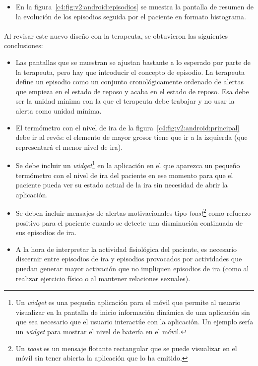 \begin{itemize}
    \item En la figura~\ref{c4:fig:v2:android:episodios} se muestra la pantalla de resumen de la evolución de los episodios seguida por el paciente en formato histograma.
\end{itemize}

\paragraph{}
Al revisar este nuevo diseño con la terapeuta, se obtuvieron las siguientes conclusiones:

\begin{itemize}
    \item Las pantallas que se muestran se ajustan bastante a lo esperado por parte de la terapeuta, pero hay que introducir el concepto de episodio. La terapeuta define un episodio como un conjunto cronológicamente ordenado de alertas que empieza en el estado de reposo y acaba en el estado de reposo. Esa debe ser la unidad mínima con la que el terapeuta debe trabajar y no usar la alerta como unidad mínima.
    \item El termómetro con el nivel de ira de la figura~\ref{c4:fig:v2:android:principal} debe ir al revés: el elemento de mayor grosor tiene que ir a la izquierda (que representará el menor nivel de ira).
    \item Se debe incluir un \textit{widget}\footnote{Un \textit{widget} es una pequeña aplicación para el móvil que permite al usuario visualizar en la pantalla de inicio información dinámica de una aplicación sin que sea necesario que el usuario interactúe con la aplicación. Un ejemplo sería un \textit{widget} para mostrar el nivel de batería en el móvil.} en la aplicación en el que aparezca un pequeño termómetro con el nivel de ira del paciente en ese momento para que el paciente pueda ver su estado actual de la ira sin necesidad de abrir la aplicación.
    \item Se deben incluir mensajes de alertas motivacionales tipo \textit{toast}\footnote{Un \textit{toast} es un mensaje flotante rectangular que se puede visualizar en el móvil sin tener abierta la aplicación que lo ha emitido.} como refuerzo positivo para el paciente cuando se detecte una disminución continuada de sus episodios de ira.
    \item A la hora de interpretar la actividad fisiológica del paciente, es necesario discernir entre episodios de ira y episodios provocados por actividades que puedan generar mayor activación que no impliquen episodios de ira (como al realizar ejercicio físico o al mantener relaciones sexuales).

\end{itemize}

